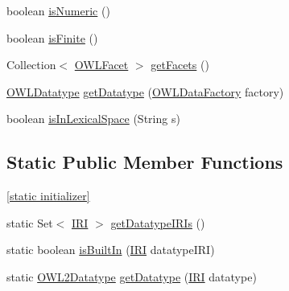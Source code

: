 \begin{DoxyCompactItemize}
\item 
boolean \hyperlink{enumorg_1_1semanticweb_1_1owlapi_1_1vocab_1_1_o_w_l2_datatype_ad5045585d9b257d635948075bfbb3cf9}{is\-Numeric} ()
\item 
boolean \hyperlink{enumorg_1_1semanticweb_1_1owlapi_1_1vocab_1_1_o_w_l2_datatype_ab910a930ac9699a753605040bda6fd67}{is\-Finite} ()
\item 
Collection$<$ \hyperlink{enumorg_1_1semanticweb_1_1owlapi_1_1vocab_1_1_o_w_l_facet}{O\-W\-L\-Facet} $>$ \hyperlink{enumorg_1_1semanticweb_1_1owlapi_1_1vocab_1_1_o_w_l2_datatype_acb72d09059ef102dcc228c2777574fdd}{get\-Facets} ()
\item 
\hyperlink{interfaceorg_1_1semanticweb_1_1owlapi_1_1model_1_1_o_w_l_datatype}{O\-W\-L\-Datatype} \hyperlink{enumorg_1_1semanticweb_1_1owlapi_1_1vocab_1_1_o_w_l2_datatype_ae154fb61ebe1182ae696752f0d39184c}{get\-Datatype} (\hyperlink{interfaceorg_1_1semanticweb_1_1owlapi_1_1model_1_1_o_w_l_data_factory}{O\-W\-L\-Data\-Factory} factory)
\item 
boolean \hyperlink{enumorg_1_1semanticweb_1_1owlapi_1_1vocab_1_1_o_w_l2_datatype_ada9aa11689e9573f440743de5f3c70b6}{is\-In\-Lexical\-Space} (String s)
\end{DoxyCompactItemize}
\subsection*{Static Public Member Functions}
\begin{DoxyCompactItemize}
\item 
\hyperlink{enumorg_1_1semanticweb_1_1owlapi_1_1vocab_1_1_o_w_l2_datatype_a5186bc49a0a5d2f29a49fe6bcbe7d374}{\mbox{[}static initializer\mbox{]}}
\item 
static Set$<$ \hyperlink{classorg_1_1semanticweb_1_1owlapi_1_1model_1_1_i_r_i}{I\-R\-I} $>$ \hyperlink{enumorg_1_1semanticweb_1_1owlapi_1_1vocab_1_1_o_w_l2_datatype_acd7747a39e4a1ad0af3b213f38dd3109}{get\-Datatype\-I\-R\-Is} ()
\item 
static boolean \hyperlink{enumorg_1_1semanticweb_1_1owlapi_1_1vocab_1_1_o_w_l2_datatype_a320933db315d5cd94149bdf02de2de38}{is\-Built\-In} (\hyperlink{classorg_1_1semanticweb_1_1owlapi_1_1model_1_1_i_r_i}{I\-R\-I} datatype\-I\-R\-I)
\item 
static \hyperlink{enumorg_1_1semanticweb_1_1owlapi_1_1vocab_1_1_o_w_l2_datatype}{O\-W\-L2\-Datatype} \hyperlink{enumorg_1_1semanticweb_1_1owlapi_1_1vocab_1_1_o_w_l2_datatype_a51abb46a8fcc7d952b10b28854f914e0}{get\-Datatype} (\hyperlink{classorg_1_1semanticweb_1_1owlapi_1_1model_1_1_i_r_i}{I\-R\-I} datatype)
\end{DoxyCompactItemize}
